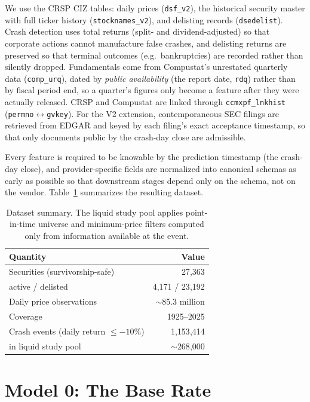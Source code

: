\documentclass[11pt]{article}
\begin{document}
We use the CRSP CIZ tables: daily prices (\texttt{dsf\_v2}), the historical security
master with full ticker history (\texttt{stocknames\_v2}), and delisting records
(\texttt{dsedelist}). Crash detection uses total returns (split- and
dividend-adjusted) so that corporate actions cannot manufacture false crashes, and
delisting returns are preserved so that terminal outcomes (e.g.\ bankruptcies) are
recorded rather than silently dropped. Fundamentals come from Compustat's unrestated
quarterly data (\texttt{comp\_urq}), dated by \emph{public availability} (the report
date, \texttt{rdq}) rather than by fiscal period end, so a quarter's figures only
become a feature after they were actually released. CRSP and Compustat are linked
through \texttt{ccmxpf\_lnkhist} (\texttt{permno}$\leftrightarrow$\texttt{gvkey}). For
the V2 extension, contemporaneous SEC filings are retrieved from EDGAR and keyed by
each filing's exact acceptance timestamp, so that only documents public by the
crash-day close are admissible.

Every feature is required to be knowable by the prediction timestamp (the crash-day
close), and provider-specific fields are normalized into canonical schemas as early
as possible so that downstream stages depend only on the schema, not on the vendor.
Table~\ref{tab:data} summarizes the resulting dataset.

\begin{table}[H]
\centering
\begin{tabular}{lr}
\toprule
Quantity & Value \\
\midrule
Securities (survivorship-safe) & 27{,}363 \\
\quad active / delisted & 4{,}171 / 23{,}192 \\
Daily price observations & $\sim$85.3 million \\
Coverage & 1925--2025 \\
Crash events (daily return $\le -10\%$) & 1{,}153{,}414 \\
\quad in liquid study pool & $\sim$268{,}000 \\
\bottomrule
\end{tabular}
\caption{Dataset summary. The liquid study pool applies point-in-time universe and
minimum-price filters computed only from information available at the event.}
\label{tab:data}
\end{table}

\section{Model 0: The Base Rate}
\label{sec:m0}
\end{document}
